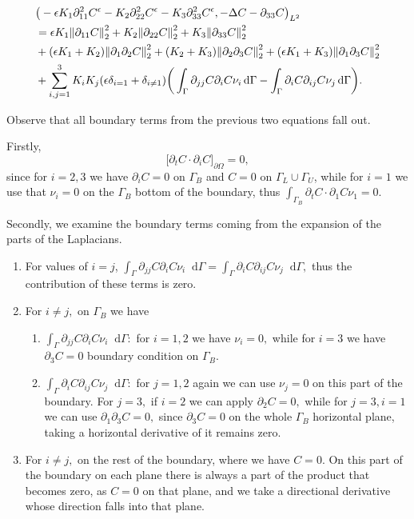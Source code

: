\documentclass[11pt]{article}
\newcommand*\diff{\mathop{}\!\mathrm{d}}
\begin{document}
\begin{equation}
  \begin{split}
  & \big ( - \epsilon K_1 \partial_{11} ^ 2 C^\epsilon - K_2 \partial_{22} ^ 2 C^\epsilon - K_3 \partial_{33} ^ 2 C^\epsilon, -\Delta C -\partial_{33} C \big) _{L^2} \\
  & = \epsilon K_1 \norm{\partial_{11} C}^2_2 + K_2 \norm{\partial_{22} C}^2_2 + K_3 \norm{\partial_{33} C}^2_2 \\
  & + (\epsilon K_1 + K_2) \norm{\partial_1 \partial_2 C}_2^2 + (K_2 + K_3) \norm{\partial_2 \partial_3 C}_2^2 + (\epsilon K_1 + K_3) \norm{\partial_1 \partial_3 C}_2^2 \\
  & + \sum_{i,j = 1}^3 K_i K_j (\epsilon \delta_{i=1} + \delta_{i \neq 1}) \bigg (\int_\Gamma \partial_{jj} C \partial_i C \nu_i \diff \Gamma - \int_\Gamma \partial_i C \partial_{ij} C \nu_j \diff \Gamma \bigg ).
  \end{split}
\end{equation}

Observe that all boundary terms from the previous two equations fall out.

Firstly, 
$$\big \lbrack \partial_t C \cdot \partial_i C \big \rbrack_{\partial \Omega} = 0,$$ since for $i = 2,3$ we have $\partial_i C = 0$ on $\Gamma_B$ and $C=0$ on $\Gamma_L \cup \Gamma_U$, while for $i=1$ we use that $\nu_i = 0$ on the $\Gamma_B$ bottom of the boundary, thus $\int_{\Gamma_B} \partial_t C \cdot \partial_1 C \nu_1 = 0.$

Secondly, we examine the boundary terms coming from the expansion of the parts of the Laplacians.

\begin{enumerate}
  \item For values of $i=j$, $\int_\Gamma \partial_{jj} C \partial_i C \nu_i \diff \Gamma = \int_\Gamma \partial_i C \partial_{ij} C \nu_j \diff \Gamma,$ thus the contribution of these terms is zero.
  \item For $i \neq j,$ on $\Gamma_B$ we have
  \begin{enumerate}
    \item $\int_\Gamma \partial_{jj} C \partial_i C \nu_i \diff \Gamma:$ for $i = 1,2$ we have $\nu_i = 0,$ while for $i=3$ we have $\partial_3 C = 0$ boundary condition on $\Gamma_B.$
    \item $\int_\Gamma \partial_i C \partial_{ij} C \nu_j \diff \Gamma:$ for $j = 1,2$ again we can use $\nu_j = 0$ on this part of the boundary. For $j = 3,$ if $i=2$ we can apply $\partial_2 C = 0,$ while for $j=3, i= 1$ we can use $\partial_1 \partial_3 C = 0,$ since $\partial_3 C = 0$ on the whole $\Gamma_B$ horizontal plane, taking a horizontal derivative of it remains zero.
  \end{enumerate}
  \item For $i \neq j,$ on the rest of the boundary, where we have $C = 0.$ On this part of the boundary on each plane there is always a part of the product that becomes zero, as $C=0$ on that plane, and we take a directional derivative whose direction falls into that plane.
\end{enumerate}
\end{document}
